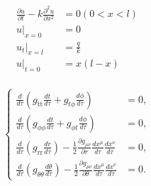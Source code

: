 \documentclass{phyasgn}
\begin{document}
\begin{sol}[4]
    \begin{align*}
        \frac{\partial u}{\partial t}-k\frac{\partial^2 u}{\partial x^2}&=0(0<x<l)\\
        u|_{x=0}&=0\\
        u_t|_{x=l}&=\frac{q}{k}\\
        u|_{t=0}&=x(l-x)\\
    \end{align*}
        
\end{sol}\par

\begin{equation}
    \left\{\begin{matrix}
     \frac{d}{d\tau} \left( g_{\text{tt}}\frac{dt}{d\tau} + g_{t\phi}\frac{d\phi}{d\tau} \right) &= 0,\\
     \frac{d}{d\tau} \left( g_{\phi\phi}\frac{dt}{d\tau} + g_{\phi t}\frac{d\phi}{d\tau} \right) &= 0,\\
     \frac{d}{d\tau}\left( g_{\text{rr}}\frac{dr}{d\tau} \right) - \frac{1}{2} \frac{\partial g_{\mu\nu}}{\partial r} \frac{dx^{\mu}}{d\tau}\frac{dx^{\nu}}{d\tau} &= 0, \\
     \frac{d}{d\tau}\left( g_{\theta\theta}\frac{d\theta}{d\tau} \right) - \frac{1}{2} \frac{\partial g_{\mu\nu}}{\partial \theta} \frac{dx^{\mu}}{d\tau}\frac{dx^{\nu}}{d\tau} &= 0.
    \end{matrix}\right.
    \end{equation}
    
\end{document}
